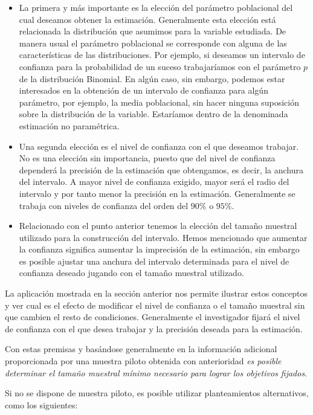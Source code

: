 \documentclass[
]{article}
\begin{document}
\begin{itemize}
\item
  La primera y más importante es la elección del parámetro poblacional del cual deseamos obtener la estimación. Generalmente esta elección está relacionada la distribución que asumimos para la variable estudiada. De manera usual el parámetro poblacional se corresponde con alguna de las características de las distribuciones. Por ejemplo, si deseamos un intervalo de confianza para la probabilidad de un suceso trabajaríamos con el parámetro \(p\) de la distribución Binomial. En algún caso, sin embargo, podemos estar interesados en la obtención de un intervalo de confianza para algún parámetro, por ejemplo, la media poblacional, sin hacer ninguna suposición sobre la distribución de la variable. Estaríamos dentro de la denominada estimación no paramétrica.
\item
  Una segunda elección es el nivel de confianza con el que deseamos trabajar. No es una elección sin importancia, puesto que del nivel de confianza dependerá la precisión de la estimación que obtengamos, es decir, la anchura del intervalo. A mayor nivel de confianza exigido, mayor será el radio del intervalo y por tanto menor la precisión en la estimación. Generalmente se trabaja con niveles de confianza del orden del \(90 \%\) o \(95 \%\).
\item
  Relacionado con el punto anterior tenemos la elección del tamaño muestral utilizado para la construcción del intervalo. Hemos mencionado que aumentar la confianza significa aumentar la imprecisión de la estimación, sin embargo es posible ajustar una anchura del intervalo determinada para el nivel de confianza deseado jugando con el tamaño muestral utilizado.
\end{itemize}

La aplicación mostrada en la sección anterior nos permite ilustrar estos conceptos y ver cual es el efecto de modificar el nivel de confianza o el tamaño muestral sin que cambien el resto de condiciones. Generalmente el investigador fijará el nivel de confianza con el que desea trabajar y la precisión deseada para la estimación.

Con estas premisas y basándose generalmente en la información adicional proporcionada por una muestra piloto obtenida con anterioridad \emph{es posible determinar el tamaño muestral mínimo necesario para lograr los objetivos fijados}.

Si no se dispone de muestra piloto, es posible utilizar planteamientos alternativos, como los siguientes:
\end{document}
